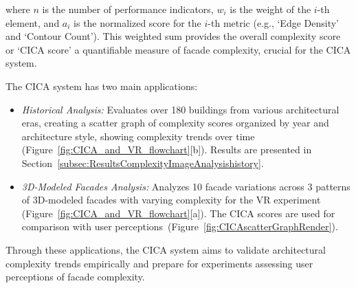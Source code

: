 where \(n\) is the number of performance indicators, \(w_i\) is the weight of the \(i\)-th element, and \(a_i\) is the normalized score for the \(i\)-th metric (e.g., `Edge Density' and `Contour Count').
This weighted sum provides the overall complexity score or `CICA score' a quantifiable measure of facade complexity, crucial for the CICA system.

The CICA system has two main applications:
\begin{itemize}
    \item \textit{Historical Analysis:} Evaluates over 180 buildings from various architectural eras, creating a scatter graph of complexity scores organized by year and architecture style, showing complexity trends over time (Figure~\ref{fig:CICA_and_VR_flowchart}[b]). Results are presented in Section~\ref{subsec:ResultsComplexityImageAnalysishistory}.

    \item \textit{3D-Modeled Facades Analysis:} Analyzes 10 facade variations across 3 patterns of 3D-modeled facades with varying complexity for the VR experiment (Figure~\ref{fig:CICA_and_VR_flowchart}[a]). The CICA scores are used for comparison with user perceptions~(Figure~\ref{fig:CICAscatterGraphRender}).
\end{itemize}

Through these applications, the CICA system aims to validate architectural complexity trends empirically and prepare for experiments assessing user perceptions of facade complexity.
